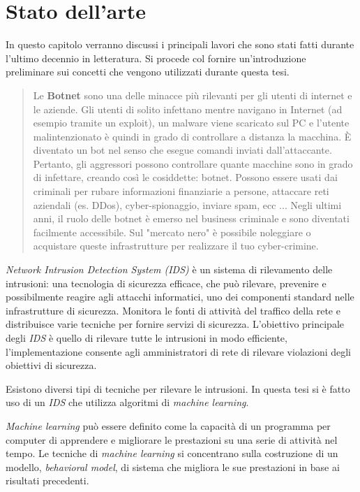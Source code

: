 \documentclass[../main.tex]{subfiles}
\begin{document}
\chapter{Stato dell'arte}

In questo capitolo verranno discussi i principali lavori che sono stati fatti durante l'ultimo decennio in letteratura. Si procede col fornire un'introduzione preliminare sui concetti che vengono utilizzati durante questa tesi.
\begin{verse}
				Le \textbf{Botnet} sono una delle minacce più rilevanti per gli utenti di internet e le aziende. Gli utenti di solito infettano mentre navigano in Internet (ad esempio tramite un exploit), un malware viene scaricato sul PC e l'utente malintenzionato è quindi in grado di controllare a distanza la macchina. È diventato un bot nel senso che esegue comandi inviati dall'attaccante. Pertanto, gli aggressori possono controllare quante macchine sono in grado di infettare, creando così le cosiddette: botnet. Possono essere usati dai criminali per rubare informazioni finanziarie a persone, attaccare reti aziendali (es. DDos), cyber-spionaggio, inviare spam, ecc ... Negli ultimi anni, il ruolo delle botnet è emerso nel business criminale e sono diventati facilmente accessibile. Sul "mercato nero" è possibile noleggiare o acquistare queste infrastrutture per realizzare il tuo cyber-crimine.
\end{verse}

\textit{Network Intrusion Detection System (IDS)} è un sistema di rilevamento delle intrusioni: una tecnologia di sicurezza efficace, che può rilevare, prevenire e possibilmente reagire agli attacchi informatici, uno dei componenti standard nelle infrastrutture di sicurezza. Monitora le fonti di attività del traffico della rete e distribuisce varie tecniche per fornire servizi di sicurezza. L'obiettivo principale degli \textit{IDS} è quello di rilevare tutte le intrusioni in modo efficiente, l'implementazione consente agli amministratori di rete di rilevare violazioni degli obiettivi di sicurezza.

Esistono diversi tipi di tecniche per rilevare le intrusioni. In questa tesi si è fatto uso di un \textit{IDS} che utilizza algoritmi di \textit{machine learning}.

\textit{Machine learning} può essere definito come la capacità di un programma per computer di apprendere e migliorare le prestazioni su una serie di attività nel tempo. Le tecniche di \textit{machine learning} si concentrano sulla costruzione di un modello, \textit{behavioral model}, di sistema che migliora le sue prestazioni in base ai risultati precedenti. \newline
\end{document}
